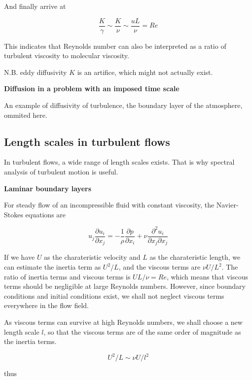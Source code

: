 \documentclass{article}
\begin{document}
And finally arrive at

\begin{equation*}
    \frac{K}{\gamma}\sim\frac{K}{\nu}\sim\frac{uL}{\nu}=Re
\end{equation*}

This indicates that Reynolds number can also be interpreted as a ratio of turbulent viscosity to molecular viscosity.

N.B. eddy diffusivity $K$ is an artifice, which might not actually exist.

\textbf{Diffusion in a problem with an imposed time scale}

An example of diffusivity of turbulence, the boundary layer of the atmosphere, ommited here.

\subsection{Length scales in turbulent flows}

In turbulent flows, a wide range of length scales exists. That is why spectral analysis of turbulent motion is useful.

\textbf{Laminar boundary layers}

For steady flow of an incompressible fluid with constant viscosity, the Navier-Stokes equations are

\begin{equation*}
    u_j\frac{\partial u_i}{\partial x_j}=-\frac{1}{\rho}\frac{\partial p}{\partial x_i}+\nu\frac{\partial^2 u_i}{\partial x_j\partial x_j}
\end{equation*}

If we have $U$ as the charateristic velocity and $L$ as the charateristic length, we can estimate the inertia term as $U^2/L$, and the viscous terms are $\nu U/L^2$.
The ratio of inertia terms and viscous terms is $UL/\nu=Re$, which means that viscous terms should be negligible at large Reynolds numbers.
However, since boundary conditions and initial conditions exist, we shall not neglect viscous terms everywhere in the flow field.

As viscous terms can survive at high Reynolds numbers, we shall choose a new length scale $l$, so that the viscous terms are of the same order of magnitude as the inertia terms.

\begin{equation*}
    U^2/L\sim\nu U/l^2
\end{equation*}

thus
\end{document}
